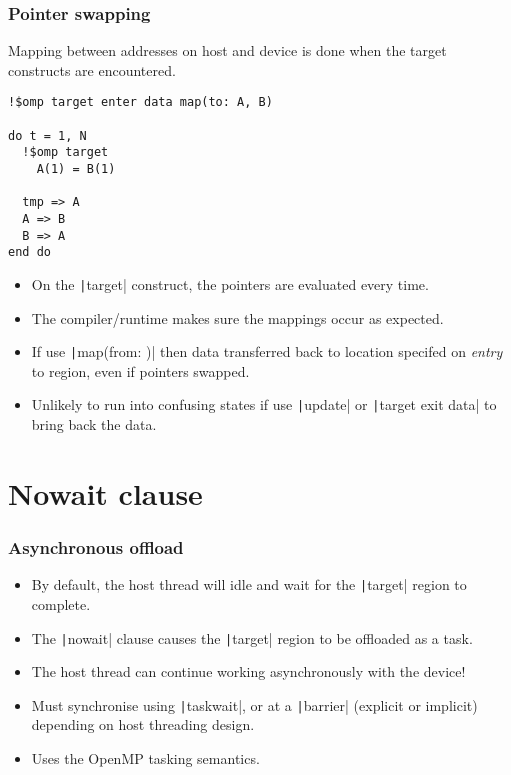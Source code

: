 \documentclass[aspectratio=169]{beamer}
\begin{document}
\begin{frame}[fragile]
\frametitle{Pointer swapping}
Mapping between addresses on host and device is done when the target constructs are encountered.
\begin{verbatim}
!$omp target enter data map(to: A, B)

do t = 1, N
  !$omp target
    A(1) = B(1)
  
  tmp => A
  A => B
  B => A
end do
\end{verbatim}

\begin{itemize}
\item On the \texttt|target| construct, the pointers are evaluated every time.
\item The compiler/runtime makes sure the mappings occur as expected.
\item If use \texttt|map(from: )| then data transferred back to location specifed on \emph{entry} to region, even if pointers swapped.
\item Unlikely to run into confusing states if use \texttt|update| or \texttt|target exit data| to bring back the data.
\end{itemize}

\end{frame}

\section{Nowait clause}
\begin{frame}
\frametitle{Asynchronous offload}
\begin{itemize}
  \item By default, the host thread will idle and wait for the \texttt|target| region to complete.
  \item The \texttt|nowait| clause causes the \texttt|target| region to be offloaded as a task.
  \item The host thread can continue working asynchronously with the device!
  \item Must synchronise using \texttt|taskwait|, or at a \texttt|barrier| (explicit or implicit) depending on host threading design.
  \item Uses the OpenMP tasking semantics.
\end{itemize}
\end{frame}
\end{document}
